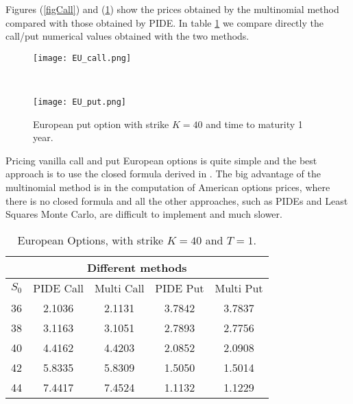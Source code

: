 Figures (\ref{figCall}) and (\ref{figPut}) show the prices obtained by the multinomial method compared with those obtained by PIDE.
In table \ref{Option_values} we compare directly the call/put numerical values obtained with the two methods.
\begin{figure}[t!]
 \begin{minipage}[b]{0.5\linewidth}
   \centering
 \texttt{[image: EU\_call.png]}
 \caption{European call option with strike $K=40$ and time to maturity 1 year.}
 \label{figCall}
  \end{minipage}
 \ \hspace{2mm} \hspace{3mm} \
 \begin{minipage}[b]{0.5\linewidth}
 \centering
 \texttt{[image: EU\_put.png]}
 \caption{European put option with strike $K=40$ and time to maturity 1 year.}
 \label{figPut}
 \end{minipage}
\end{figure}

Pricing vanilla call and put European options is quite simple and the best approach is to use the closed formula derived in \cite{MCC98}.
The big advantage of the multinomial method is in the computation of American options prices, where there is no closed formula and all the other approaches, 
such as PIDEs and Least Squares Monte Carlo, are difficult to implement and much slower.
\begin{table}[h!]
{\begin{tabular}{||l|c|c|c|c||} 
\hline
\multicolumn{5}{|c|}{Different methods} \\
\hline
$S_0$ & PIDE Call & Multi Call & PIDE Put & Multi Put \\
\hline
36 & 2.1036 & 2.1131 & 3.7842 & 3.7837  \\
  38 & 3.1163 & 3.1051 & 2.7893 & 2.7756 \\
  40 & 4.4162 & 4.4203 & 2.0852 & 2.0908 \\
  42 & 5.8335 & 5.8309 & 1.5050 & 1.5014 \\
  44 & 7.4417 & 7.4524 & 1.1132 & 1.1229 \\
\hline
\end{tabular}}
\caption{European Options, with strike $K=40$ and $T=1$.}
\label{Option_values}
\end{table}



